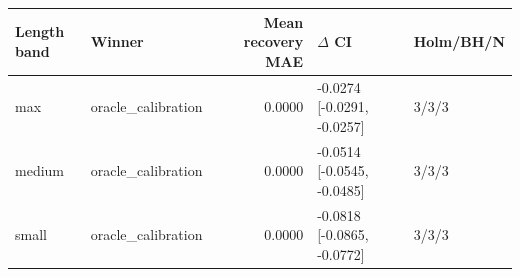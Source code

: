 \begin{tabular}{llrll}
\toprule
Length band & Winner & Mean recovery MAE & $\Delta$ CI & Holm/BH/N \\
\midrule
max & oracle\_calibration & 0.0000 & -0.0274 [-0.0291, -0.0257] & 3/3/3 \\
medium & oracle\_calibration & 0.0000 & -0.0514 [-0.0545, -0.0485] & 3/3/3 \\
small & oracle\_calibration & 0.0000 & -0.0818 [-0.0865, -0.0772] & 3/3/3 \\
\bottomrule
\end{tabular}
